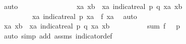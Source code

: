 \begin{isabellebody}
\ auto\isanewline
\ \ \ \ \ \ \isanewline
\ \ \ \ \ \ \isamarkupfalse%
\ \isamarkupfalse%
\ {\isachardoublequoteopen}{\isacharparenleft}{\kern0pt}{\isasymSum}xa{\isasymin}{\isasymK}{\isachardot}{\kern0pt}\ {\isacharparenleft}{\kern0pt}{\isasymSum}xb{\isasymin}{\isacharparenleft}{\kern0pt}{\isasymK}\ {\isacharminus}{\kern0pt}\ {\isacharbraceleft}{\kern0pt}xa{\isacharbraceright}{\kern0pt}{\isacharparenright}{\kern0pt}{\isachardot}{\kern0pt}\ {\isacharparenleft}{\kern0pt}indicat{\isacharunderscore}{\kern0pt}real\ {\isacharbraceleft}{\kern0pt}{\isacharparenleft}{\kern0pt}p{\isacharcomma}{\kern0pt}\ q{\isacharparenright}{\kern0pt}{\isacharbraceright}{\kern0pt}\ {\isacharparenleft}{\kern0pt}xa{\isacharcomma}{\kern0pt}\ xb{\isacharparenright}{\kern0pt}{\isacharparenright}{\kern0pt}{\isacharparenright}{\kern0pt}{\isacharparenright}{\kern0pt}\ {\isacharequal}{\kern0pt}\isanewline
\ \ \ \ \ \ \ \ \ {\isacharparenleft}{\kern0pt}{\isasymSum}xa{\isasymin}{\isasymK}{\isachardot}{\kern0pt}\ indicat{\isacharunderscore}{\kern0pt}real\ {\isacharbraceleft}{\kern0pt}p{\isacharbraceright}{\kern0pt}\ xa\ {\isacharasterisk}{\kern0pt}\ {\isacharquery}{\kern0pt}f{\isacharunderscore}{\kern0pt}{}\ xa{\isacharparenright}{\kern0pt}{\isachardoublequoteclose}\ \isamarkupfalse%
\ auto\isanewline
\ \ \ \ \ \ \isamarkupfalse%
\ \isamarkupfalse%
\ {\isachardoublequoteopen}{\isacharparenleft}{\kern0pt}{\isasymSum}xa{\isasymin}{\isasymK}{\isachardot}{\kern0pt}\ {\isacharparenleft}{\kern0pt}{\isasymSum}xb{\isasymin}{\isacharparenleft}{\kern0pt}{\isasymK}\ {\isacharminus}{\kern0pt}\ {\isacharbraceleft}{\kern0pt}xa{\isacharbraceright}{\kern0pt}{\isacharparenright}{\kern0pt}{\isachardot}{\kern0pt}\ {\isacharparenleft}{\kern0pt}indicat{\isacharunderscore}{\kern0pt}real\ {\isacharbraceleft}{\kern0pt}{\isacharparenleft}{\kern0pt}p{\isacharcomma}{\kern0pt}\ q{\isacharparenright}{\kern0pt}{\isacharbraceright}{\kern0pt}\ {\isacharparenleft}{\kern0pt}xa{\isacharcomma}{\kern0pt}\ xb{\isacharparenright}{\kern0pt}{\isacharparenright}{\kern0pt}{\isacharparenright}{\kern0pt}{\isacharparenright}{\kern0pt}\ {\isacharequal}{\kern0pt}\isanewline
\ \ \ \ \ \ \ \ \ sum\ {\isacharquery}{\kern0pt}f{\isacharunderscore}{\kern0pt}{}\ {\isacharparenleft}{\kern0pt}{\isasymK}\ {\isasyminter}\ {\isacharbraceleft}{\kern0pt}p{\isacharbraceright}{\kern0pt}{\isacharparenright}{\kern0pt}{\isachardoublequoteclose}\ \isanewline
\ \ \ \ \ \ \ \ \isamarkupfalse%
\ {\isacharparenleft}{\kern0pt}auto\ simp\ add{\isacharcolon}{\kern0pt}\ assms{\isacharparenleft}{\kern0pt}{}{\isacharparenright}{\kern0pt}\ indicator{\isacharunderscore}{\kern0pt}def{\isacharparenright}{\kern0pt}\isanewline

\end{isabellebody}
